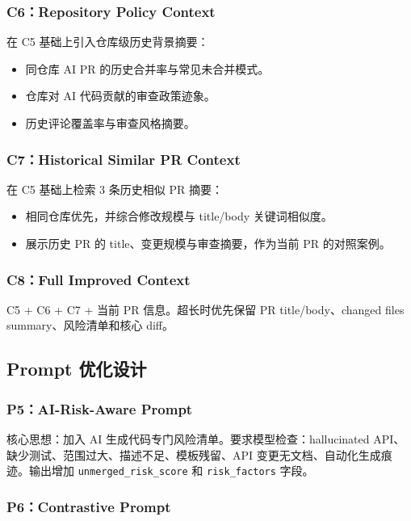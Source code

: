 \documentclass{experimentreport}
\begin{document}
\subsubsection{C6：Repository Policy Context}

在 C5 基础上引入仓库级历史背景摘要：
\begin{itemize}
    \item 同仓库 AI PR 的历史合并率与常见未合并模式。
    \item 仓库对 AI 代码贡献的审查政策迹象。
    \item 历史评论覆盖率与审查风格摘要。
\end{itemize}

\subsubsection{C7：Historical Similar PR Context}

在 C5 基础上检索 3 条历史相似 PR 摘要：
\begin{itemize}
    \item 相同仓库优先，并综合修改规模与 title/body 关键词相似度。
    \item 展示历史 PR 的 title、变更规模与审查摘要，作为当前 PR 的对照案例。
\end{itemize}

\subsubsection{C8：Full Improved Context}

C5 + C6 + C7 + 当前 PR 信息。超长时优先保留 PR title/body、changed files summary、风险清单和核心 diff。

\subsection{Prompt 优化设计}

\subsubsection{P5：AI-Risk-Aware Prompt}

核心思想：加入 AI 生成代码专门风险清单。要求模型检查：hallucinated API、缺少测试、范围过大、描述不足、模板残留、API 变更无文档、自动化生成痕迹。输出增加 \texttt{unmerged\_risk\_score} 和 \texttt{risk\_factors} 字段。

\subsubsection{P6：Contrastive Prompt}
\end{document}
